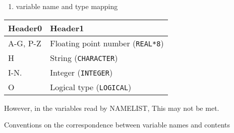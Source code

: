 \begin{enumerate}
\def\labelenumi{\arabic{enumi}.}
\setcounter{enumi}{1}
\tightlist
\item
  variable name and type mapping
\end{enumerate}

\begin{longtable}[]{@{}ll@{}}
\toprule
Header0 & Header1\tabularnewline
\midrule
\endhead
A-G, P-Z & Floating point number ({\texttt{REAL*8}})\tabularnewline
H & String ({\texttt{CHARACTER}})\tabularnewline
I-N. & Integer ({\texttt{INTEGER}})\tabularnewline
O & Logical type ({\texttt{LOGICAL}})\tabularnewline
\bottomrule
\end{longtable}

However, in the variables read by NAMELIST, This may not be met.

Conventions on the correspondence between variable names and contents

